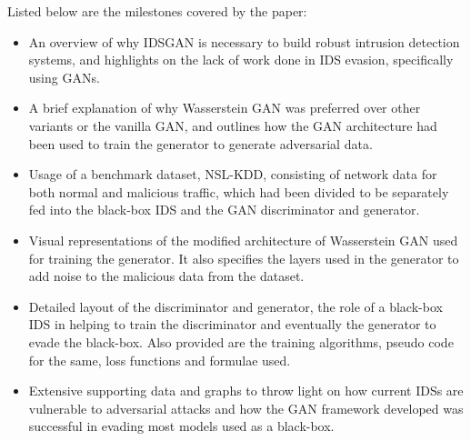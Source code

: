 \documentclass[twoside,twocolumn]{article}
\begin{document}
Listed below are the milestones covered by the paper: 
\begin{itemize}

\item An overview of why IDSGAN is necessary to build robust intrusion detection systems, and highlights on the lack of work done in IDS evasion, specifically using GANs.

\item A brief explanation of why Wasserstein GAN was preferred over other variants or the vanilla GAN, and outlines how the GAN architecture had been used to train the generator to generate adversarial data.

\item Usage of a benchmark dataset, NSL-KDD, consisting of network data for both normal and malicious traffic, which had been divided to be separately fed into the black-box IDS and the GAN discriminator and generator.

\item Visual representations of the modified architecture of Wasserstein GAN used for training the generator. It also specifies the layers used in the generator to add noise to the malicious data from the dataset.

\item Detailed layout of the discriminator and generator, the role of a black-box IDS in helping to train the discriminator and eventually the generator to evade the black-box. Also provided are the training algorithms, pseudo code for the same, loss functions and formulae used.

\item Extensive supporting data and graphs to throw light on how current IDSs are vulnerable to adversarial attacks and how the GAN framework developed was successful in evading most models used as a black-box.

\end{itemize}

\end{document}
